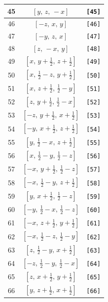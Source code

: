 \documentclass[fleqn,8pt]{jsarticle}
\begin{document}
\begin{longtable}{ccc}
45 & $\left[ y,\, z,\, - x \right]$ & {\tt [45]} \\ \hline
46 & $\left[ - z,\, x,\, y \right]$ & {\tt [46]} \\ \hline
47 & $\left[ - y,\, z,\, x \right]$ & {\tt [47]} \\ \hline
48 & $\left[ z,\, - x,\, y \right]$ & {\tt [48]} \\ \hline
49 & $\left[ x,\, y + \frac{1}{2},\, z + \frac{1}{2} \right]$ & {\tt [49]} \\ \hline
50 & $\left[ x,\, \frac{1}{2} - z,\, y + \frac{1}{2} \right]$ & {\tt [50]} \\ \hline
51 & $\left[ x,\, z + \frac{1}{2},\, \frac{1}{2} - y \right]$ & {\tt [51]} \\ \hline
52 & $\left[ z,\, y + \frac{1}{2},\, \frac{1}{2} - x \right]$ & {\tt [52]} \\ \hline
53 & $\left[ - z,\, y + \frac{1}{2},\, x + \frac{1}{2} \right]$ & {\tt [53]} \\ \hline
54 & $\left[ - y,\, x + \frac{1}{2},\, z + \frac{1}{2} \right]$ & {\tt [54]} \\ \hline
55 & $\left[ y,\, \frac{1}{2} - x,\, z + \frac{1}{2} \right]$ & {\tt [55]} \\ \hline
56 & $\left[ x,\, \frac{1}{2} - y,\, \frac{1}{2} - z \right]$ & {\tt [56]} \\ \hline
57 & $\left[ - x,\, y + \frac{1}{2},\, \frac{1}{2} - z \right]$ & {\tt [57]} \\ \hline
58 & $\left[ - x,\, \frac{1}{2} - y,\, z + \frac{1}{2} \right]$ & {\tt [58]} \\ \hline
59 & $\left[ y,\, x + \frac{1}{2},\, \frac{1}{2} - z \right]$ & {\tt [59]} \\ \hline
60 & $\left[ - y,\, \frac{1}{2} - x,\, \frac{1}{2} - z \right]$ & {\tt [60]} \\ \hline
61 & $\left[ - x,\, z + \frac{1}{2},\, y + \frac{1}{2} \right]$ & {\tt [61]} \\ \hline
62 & $\left[ - x,\, \frac{1}{2} - z,\, \frac{1}{2} - y \right]$ & {\tt [62]} \\ \hline
63 & $\left[ z,\, \frac{1}{2} - y,\, x + \frac{1}{2} \right]$ & {\tt [63]} \\ \hline
64 & $\left[ - z,\, \frac{1}{2} - y,\, \frac{1}{2} - x \right]$ & {\tt [64]} \\ \hline
65 & $\left[ z,\, x + \frac{1}{2},\, y + \frac{1}{2} \right]$ & {\tt [65]} \\ \hline
66 & $\left[ y,\, z + \frac{1}{2},\, x + \frac{1}{2} \right]$ & {\tt [66]} \\ \hline

\end{longtable}
\end{document}
